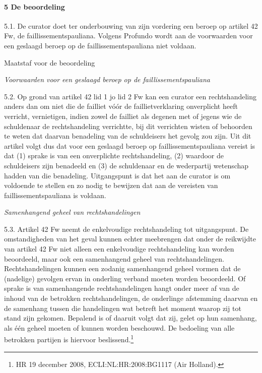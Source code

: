 \documentclass[
  dutch,
  a4paper,
]{article}
\begin{document}
\paragraph{5 De beoordeling}\label{de-beoordeling-1}

5.1. De curator doet ter onderbouwing van zijn vordering een beroep op artikel 42 Fw, de faillissementspauliana. Volgens Profundo wordt aan de voorwaarden voor een geslaagd beroep op de faillissementspauliana niet voldaan.

Maatstaf voor de beoordeling

\emph{Voorwaarden voor een geslaagd beroep op de faillissementspauliana}

5.2. Op grond van artikel 42 lid 1 jo lid 2 Fw kan een curator een rechtshandeling anders dan om niet die de failliet vóór de faillietverklaring onverplicht heeft verricht, vernietigen, indien zowel de failliet als degenen met of jegens wie de schuldenaar de rechtshandeling verrichtte, bij dit verrichten wisten of behoorden te weten dat daarvan benadeling van de schuldeisers het gevolg zou zijn. Uit dit artikel volgt dus dat voor een geslaagd beroep op faillissementspauliana vereist is dat (1) sprake is van een onverplichte rechtshandeling, (2) waardoor de schuldeisers zijn benadeeld en (3) de schuldenaar en de wederpartij wetenschap hadden van die benadeling. Uitgangspunt is dat het aan de curator is om voldoende te stellen en zo nodig te bewijzen dat aan de vereisten van faillissementspauliana is voldaan.

\emph{Samenhangend geheel van rechtshandelingen}

5.3. Artikel 42 Fw neemt de enkelvoudige rechtshandeling tot uitgangspunt. De omstandigheden van het geval kunnen echter meebrengen dat onder de reikwijdte van artikel 42 Fw niet alleen een enkelvoudige rechtshandeling kan worden beoordeeld, maar ook een samenhangend geheel van rechtshandelingen. Rechtshandelingen kunnen een zodanig samenhangend geheel vormen dat de (nadelige) gevolgen ervan in onderling verband moeten worden beoordeeld. Of sprake is van samenhangende rechtshandelingen hangt onder meer af van de inhoud van de betrokken rechtshandelingen, de onderlinge afstemming daarvan en de samenhang tussen die handelingen wat betreft het moment waarop zij tot stand zijn gekomen. Bepalend is of daaruit volgt dat zij, gelet op hun samenhang, als één geheel moeten of kunnen worden beschouwd. De bedoeling van alle betrokken partijen is hiervoor beslissend.\footnote{HR 19 december 2008, ECLI:NL:HR:2008:BG1117 (Air Holland).}
\end{document}

